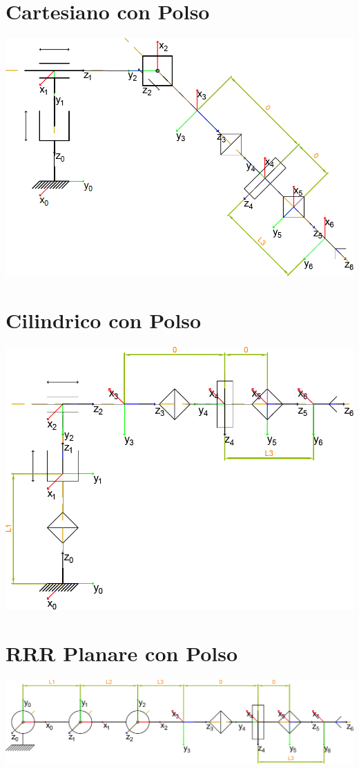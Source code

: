 \documentclass[a4paper,11pt]{article}
\begin{document}
\section*{Cartesiano con Polso}
\includegraphics{Sorgenti/Strutture+Polso/Cartesiano+p.png}


\section*{Cilindrico con Polso}
\includegraphics{Sorgenti/Strutture+Polso/Cilindrico+p.png}


\section*{RRR Planare con Polso}
\includegraphics{Sorgenti/Strutture+Polso/RRRplanare+p.png}

\end{document}
